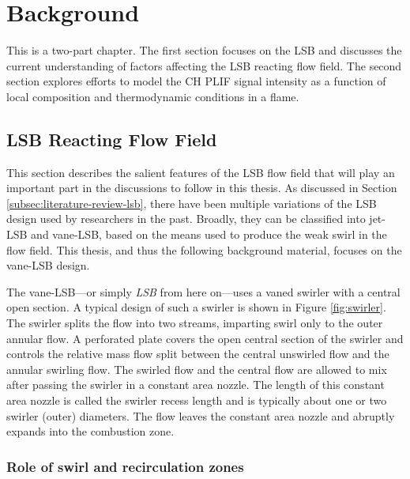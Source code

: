 \chapter{Background}
\label{ch:background}


This is a two-part chapter.
The first section focuses on the LSB and discusses the current understanding of factors affecting the LSB reacting flow field.
The second section explores efforts to model the CH PLIF signal intensity as a function of local composition and thermodynamic conditions in a flame.

\section{LSB Reacting Flow Field}

This section describes the salient features of the LSB flow field that will play an important part in the discussions to follow in this thesis.
As discussed in Section \ref{subsec:literature-review-lsb}, there have been multiple variations of the LSB design used by researchers in the past.
Broadly, they can be classified into jet-LSB and vane-LSB, based on the means used to produce the weak swirl in the flow field.
This thesis, and thus the following background material, focuses on the vane-LSB design.



The vane-LSB---or simply \emph{LSB} from here on---uses a vaned swirler
with a central open section.
A typical design of such a swirler is shown in Figure \ref{fig:swirler}.
The swirler splits the flow into two streams, imparting swirl only to the outer annular flow.
A perforated plate covers the open central section of the swirler and controls the relative mass flow split between the central unswirled flow and the annular swirling flow.
The swirled flow and the central flow are allowed to mix after passing the swirler in a constant area nozzle.
The length of this constant area nozzle is called the swirler recess length and is typically about one or two swirler (outer) diameters.
The flow leaves the constant area nozzle and abruptly expands into the combustion zone.

\subsection{Role of swirl and recirculation zones}

